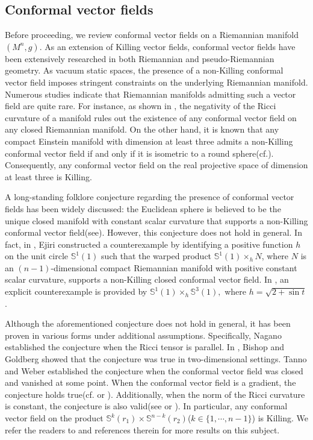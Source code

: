 \documentclass[10pt,leqno,oneside]{amsart}
\begin{document}
   \subsection{Conformal vector fields}
          Before proceeding, we review conformal vector fields on a Riemannian manifold $(M^n, g).$ As an extension of Killing vector fields, conformal vector fields have been extensively researched in both Riemannian and pseudo-Riemannian geometry. As vacuum static spaces, the presence of a non-Killing conformal vector field imposes stringent constraints on the underlying Riemannian manifold. Numerous studies indicate that Riemannian manifolds admitting such a vector field are quite rare. For instance, as shown in \cite{Yano1952}, the negativity of the Ricci curvature of a manifold rules out the existence of any conformal vector field on any closed Riemannian manifold. On the other hand, it is known that any compact Einstein manifold with dimension at least three admits a non-Killing conformal vector field if and only if it is isometric to a round sphere(cf.\cite{Obata1962}). Consequently, any conformal vector field on the real projective space of dimension at least three is Killing.

          A long-standing folklore conjecture regarding the presence of conformal vector fields has been widely discussed: the Euclidean sphere is believed to be the unique closed manifold with constant scalar curvature that supports a non-Killing conformal vector field(see\cite{Ejiri}).
          However, this conjecture does not hold in general. In fact, in \cite{Ejiri}, Ejiri constructed a counterexample by identifying a positive function \(h\) on the unit circle \(\mathbb{S}^1(1)\) such that the warped product \(\mathbb{S}^1(1)\times_h N\), where \(N\) is an \((n-1)\)-dimensional compact Riemannian manifold with positive constant scalar curvature, supports a non-Killing closed conformal vector field. In \cite[Remark 2]{Derdzinski1980}, an explicit counterexample is provided by $\mathbb S^1(1)\times_h\mathbb S^3(1),$ where $h=\sqrt{2+\sin t}$.

          Although the aforementioned conjecture does not hold in general, it has been proven in various forms under additional assumptions. Specifically, Nagano \cite{Nagano1959} established the conjecture when the Ricci tensor is parallel. In \cite{1966}, Bishop and Goldberg showed that the conjecture was true in two-dimensional settings. Tanno and Weber \cite[Theorem 1]{TannoWeber1969} established the conjecture when the conformal vector field was closed and vanished at some point. When the conformal vector field is a gradient, the conjecture holds true(cf.\cite{YanoObata1965} or \cite[Theorem 4.4]{Xu1993}). Additionally, when the norm of the Ricci curvature is constant, the conjecture is also valid(see \cite{Lichnerowicz1964} or \cite[Theorem 2]{XuYe}). In particular, any conformal vector field on the product $\mathbb{S}^k(r_1)\times\mathbb{S}^{n-k}(r_2)$($k\in\{1,\cdots,n-1\}$) is Killing. We refer the readers to \cite{1966}\cite{DAS2014CM} \cite{DAS2014}\cite{DAS2012}\cite{DAS2008}\cite{TannoWeber1969}\cite{Xu1993}\cite{Yano1975}\cite{YanoObata1965}\cite{Nagano1959} and references therein for more results on this subject.
\end{document}
